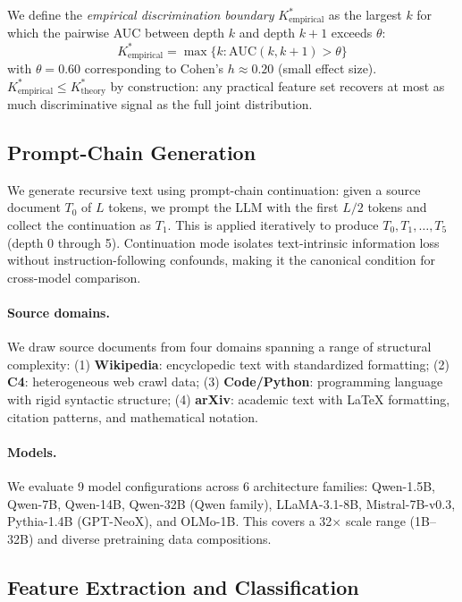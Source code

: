 \documentclass[11pt,a4paper]{article}
\newcommand{\kstar}{K^{*}}
\newcommand{\auc}{\mathrm{AUC}}
\begin{document}
We define the \emph{empirical discrimination boundary} $\kstar_{\mathrm{empirical}}$ as the largest $k$ for which the pairwise AUC between depth $k$ and depth $k\!+\!1$ exceeds $\theta$:
\begin{equation}
  \kstar_{\mathrm{empirical}} = \max\{k : \auc(k, k\!+\!1) > \theta\}
\end{equation}
with $\theta = 0.60$ corresponding to Cohen's $h \approx 0.20$ (small effect size).
$\kstar_{\mathrm{empirical}} \leq \kstar_{\mathrm{theory}}$ by construction: any practical feature set recovers at most as much discriminative signal as the full joint distribution.

\subsection{Prompt-Chain Generation}

We generate recursive text using prompt-chain continuation: given a source document $T_0$ of $L$ tokens, we prompt the LLM with the first $L/2$ tokens and collect the continuation as $T_1$. This is applied iteratively to produce $T_0, T_1, \ldots, T_5$ (depth 0 through 5).
Continuation mode isolates text-intrinsic information loss without instruction-following confounds, making it the canonical condition for cross-model comparison.

\paragraph{Source domains.}
We draw source documents from four domains spanning a range of structural complexity:
(1) \textbf{Wikipedia}: encyclopedic text with standardized formatting;
(2) \textbf{C4}: heterogeneous web crawl data;
(3) \textbf{Code/Python}: programming language with rigid syntactic structure;
(4) \textbf{arXiv}: academic text with LaTeX formatting, citation patterns, and mathematical notation.

\paragraph{Models.}
We evaluate 9 model configurations across 6 architecture families: Qwen-1.5B, Qwen-7B, Qwen-14B, Qwen-32B (Qwen family), LLaMA-3.1-8B, Mistral-7B-v0.3, Pythia-1.4B (GPT-NeoX), and OLMo-1B.
This covers a 32$\times$ scale range (1B--32B) and diverse pretraining data compositions.

\subsection{Feature Extraction and Classification}
\end{document}
